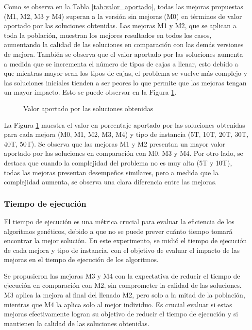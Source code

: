 Como se observa en la Tabla \ref{tab:valor_aportado}, todas las mejoras propuestas (M1, M2, M3 y M4) superan a la versión sin mejoras (M0) en términos de valor aportado por las soluciones obtenidas. Las mejoras M1 y M2, que se aplican a toda la población, muestran los mejores resultados en todos los casos, aumentando la calidad de las soluciones en comparación con las demás versiones de mejora. También se observa que el valor aportado por las soluciones aumenta a medida que se incrementa el número de tipos de cajas a llenar, esto debido a que mientras mayor sean los tipos de cajas, el problema se vuelve más complejo y las soluciones iniciales tienden a ser peores lo que permite que las mejoras tengan un mayor impacto. Esto se puede observar en la Figura \ref{fig:valores}.

\begin{figure}[H]
    \centering
    
    \caption{Valor aportado por las soluciones obtenidas}
    \label{fig:valores}
\end{figure}


La Figura \ref{fig:valores} muestra el valor en porcentaje aportado por las soluciones obtenidas para cada mejora (M0, M1, M2, M3, M4) y tipo de instancia (5T, 10T, 20T, 30T, 40T, 50T). Se observa que las mejoras M1 y M2 presentan un mayor valor aportado por las soluciones en comparación con M0, M3 y M4. Por otro lado, se destaca que cuando la complejidad del problema no es muy alta (5T y 10T), todas las mejoras presentan desempeños similares, pero a medida que la complejidad aumenta, se observa una clara diferencia entre las mejoras.


\subsubsection{Tiempo de ejecución}

El tiempo de ejecución es una métrica crucial para evaluar la eficiencia de los algoritmos genéticos, debido a que no se puede prever cuánto tiempo tomará encontrar la mejor solución. En este experimento, se midió el tiempo de ejecución de cada mejora y tipo de instancia, con el objetivo de evaluar el impacto de las mejoras en el tiempo de ejecución de los algoritmos.

Se propusieron las mejoras M3 y M4 con la expectativa de reducir el tiempo de ejecución en comparación con M2, sin comprometer la calidad de las soluciones. M3 aplica la mejora al final del llenado M2, pero solo a la mitad de la población, mientras que M4 la aplica solo al mejor individuo. Es crucial evaluar si estas mejoras efectivamente logran su objetivo de reducir el tiempo de ejecución y si mantienen la calidad de las soluciones obtenidas.


